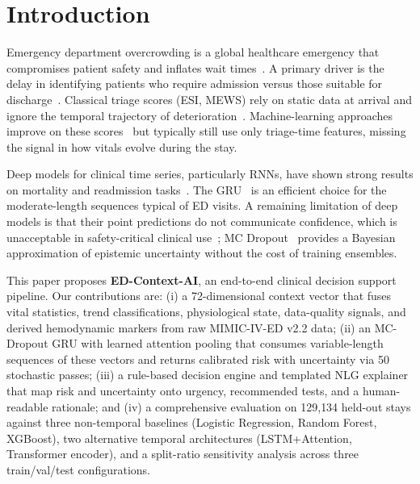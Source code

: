 \documentclass[runningheads]{llncs}
\begin{document}
\section{Introduction}

Emergency department overcrowding is a global healthcare emergency that compromises patient safety and inflates wait times~\cite{Hoot2008,Morley2018}. A primary driver is the delay in identifying patients who require admission versus those suitable for discharge~\cite{Peck2012}. Classical triage scores (ESI, MEWS) rely on static data at arrival and ignore the temporal trajectory of deterioration~\cite{Levin2018}. Machine-learning approaches improve on these scores~\cite{Raita2019,Hong2018} but typically still use only triage-time features, missing the signal in how vitals evolve during the stay.

Deep models for clinical time series, particularly RNNs, have shown strong results on mortality and readmission tasks~\cite{Rajkomar2018,Choi2016}. The GRU~\cite{Cho2014} is an efficient choice for the moderate-length sequences typical of ED visits. A remaining limitation of deep models is that their point predictions do not communicate confidence, which is unacceptable in safety-critical clinical use~\cite{Begoli2019}; MC Dropout~\cite{Gal2016} provides a Bayesian approximation of epistemic uncertainty without the cost of training ensembles.

This paper proposes \textbf{ED-Context-AI}, an end-to-end clinical decision support pipeline. Our contributions are: (i) a 72-dimensional context vector that fuses vital statistics, trend classifications, physiological state, data-quality signals, and derived hemodynamic markers from raw MIMIC-IV-ED v2.2 data; (ii) an MC-Dropout GRU with learned attention pooling that consumes variable-length sequences of these vectors and returns calibrated risk with uncertainty via 50 stochastic passes; (iii) a rule-based decision engine and templated NLG explainer that map risk and uncertainty onto urgency, recommended tests, and a human-readable rationale; and (iv) a comprehensive evaluation on 129{,}134 held-out stays against three non-temporal baselines (Logistic Regression, Random Forest, XGBoost), two alternative temporal architectures (LSTM+Attention, Transformer encoder), and a split-ratio sensitivity analysis across three train/val/test configurations.
\end{document}
